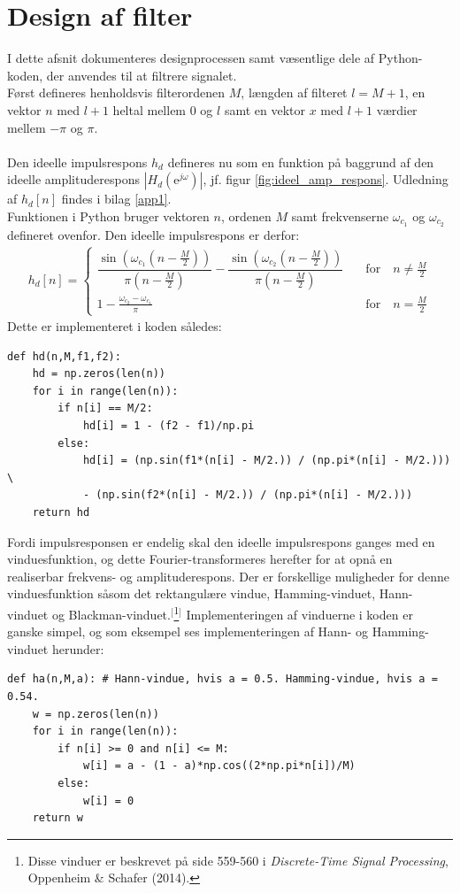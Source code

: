 \section{Design af filter} \label{ch4_design}
I dette afsnit dokumenteres designprocessen samt væsentlige dele af Python-koden, der anvendes til at filtrere signalet.\\
Først defineres henholdsvis filterordenen $M$, længden af filteret $l = M + 1$, en vektor $n$ med $l+1$ heltal mellem 0 og $l$ samt en vektor $x$ med $l+1$ værdier mellem $-\pi$ og $\pi$.
\\ \\
Den ideelle impulsrespons $h_d$ defineres nu som en funktion på baggrund af den ideelle amplituderespons $|H_d(\text{e}^{j\omega})|$, jf. figur \ref{fig:ideel_amp_respons}. Udledning af $h_d[n]$ findes i bilag \ref{app1}. \\
Funktionen i Python bruger vektoren $n$, ordenen $M$ samt frekvenserne $\omega_{c_1}$ og $\omega_{c_2}$ defineret ovenfor. Den ideelle impulsrespons er derfor:
\begin{align*}
h_d[n] = \begin{cases} \dfrac{\sin\left(\omega_{c_1}\left(n - \frac{M}{2}\right)\right)}{\pi\left(n - \frac{M}{2}\right)} - \dfrac{\sin\left(\omega_{c_2}\left(n - \frac{M}{2}\right)\right)}{\pi\left(n - \frac{M}{2}\right)} \quad &\text{for} \quad n \neq \frac{M}{2} \\
1 - \frac{\omega_{c_2} - \omega_{c_1}}{\pi} \quad &\text{for} \quad n = \frac{M}{2}
\end{cases}
\end{align*}
Dette er implementeret i koden således:
\begin{lstlisting}
def hd(n,M,f1,f2): 
    hd = np.zeros(len(n))
    for i in range(len(n)):
        if n[i] == M/2:
            hd[i] = 1 - (f2 - f1)/np.pi
        else:
            hd[i] = (np.sin(f1*(n[i] - M/2.)) / (np.pi*(n[i] - M/2.))) \
            - (np.sin(f2*(n[i] - M/2.)) / (np.pi*(n[i] - M/2.)))
    return hd
\end{lstlisting}
Fordi impulsresponsen er endelig skal den ideelle impulsrespons ganges med en vinduesfunktion, og dette Fourier-transformeres herefter for at opnå en realiserbar frekvens- og amplituderespons. Der er forskellige muligheder for denne vinduesfunktion såsom det rektangulære vindue, Hamming-vinduet, Hann-vinduet og Blackman-vinduet.$^[$\footnote{Disse vinduer er beskrevet på side 559-560 i \textit{Discrete-Time Signal Processing}, Oppenheim \& Schafer (2014).}$^]$ Implementeringen af vinduerne i koden er ganske simpel, og som eksempel ses implementeringen af Hann- og Hamming-vinduet herunder:
\begin{lstlisting}
def ha(n,M,a): # Hann-vindue, hvis a = 0.5. Hamming-vindue, hvis a = 0.54.
    w = np.zeros(len(n))
    for i in range(len(n)):
        if n[i] >= 0 and n[i] <= M:
            w[i] = a - (1 - a)*np.cos((2*np.pi*n[i])/M)
        else:
            w[i] = 0
    return w
\end{lstlisting}

